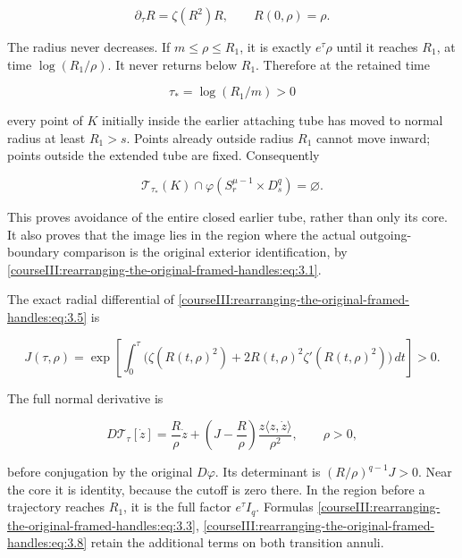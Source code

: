 \begin{equation}
\partial_\tau R=\zeta(R^2)R,\qquad R(0,\rho)=\rho.
\label{courseIII:rearranging-the-original-framed-handles:eq:3.5}
\end{equation}

The radius never decreases. If \(m\leq\rho\leq R_1\), it is exactly \(e^\tau\rho\) until it reaches \(R_1\), at time \(\log(R_1/\rho)\). It never returns below \(R_1\). Therefore at the retained time

\begin{equation}
\tau_*=\log(R_1/m)>0
\label{courseIII:rearranging-the-original-framed-handles:eq:3.6}
\end{equation}

every point of \(K\) initially inside the earlier attaching tube has moved to normal radius at least \(R_1>s\). Points already outside radius \(R_1\) cannot move inward; points outside the extended tube are fixed. Consequently

\begin{equation}
\mathcal T_{\tau_*}(K)
\cap\varphi(S_r^{\mu-1}\times D_s^q)=\varnothing.
\label{courseIII:rearranging-the-original-framed-handles:eq:3.7}
\end{equation}

This proves avoidance of the entire closed earlier tube, rather than only its core. It also proves that the image lies in the region where the actual outgoing-boundary comparison is the original exterior identification, by \eqref{courseIII:rearranging-the-original-framed-handles:eq:3.1}.

The exact radial differential of \eqref{courseIII:rearranging-the-original-framed-handles:eq:3.5} is

\begin{equation}
J(\tau,\rho)=
\exp\left[\int_0^\tau
 \bigl(\zeta(R(t,\rho)^2)+2R(t,\rho)^2\zeta'(R(t,\rho)^2)\bigr)\,dt\right]>0.
\label{courseIII:rearranging-the-original-framed-handles:eq:3.8}
\end{equation}

The full normal derivative is

\begin{equation}
D\mathcal T_\tau[\dot z]
=\frac R\rho\dot z+
 \left(J-\frac R\rho\right)
 \frac{z\langle z,\dot z\rangle}{\rho^2},
\qquad \rho>0,
\label{courseIII:rearranging-the-original-framed-handles:eq:3.9}
\end{equation}

before conjugation by the original \(D\varphi\). Its determinant is \((R/\rho)^{q-1}J>0\). Near the core it is identity, because the cutoff is zero there. In the region before a trajectory reaches \(R_1\), it is the full factor \(e^\tau I_q\). Formulas \eqref{courseIII:rearranging-the-original-framed-handles:eq:3.3}, \eqref{courseIII:rearranging-the-original-framed-handles:eq:3.8} retain the additional terms on both transition annuli.

